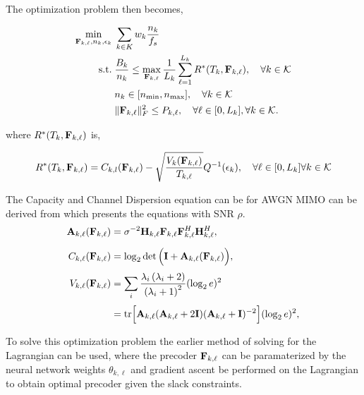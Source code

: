 \documentclass[a4paper, 12pt, onecolumn, journal, twoside, draftclsnofoot]{IEEEtran}
\begin{document}
The optimization problem then becomes, 

\begin{equation*}
	\begin{split}
		\min_{{\bf F}_{k,\ell}, n_k, \epsilon_k} \;& \sum_{k \in K} w_k \frac{n_k}{f_s} \\
		\text{s.t.}\;& \frac{B_k}{n_k} \leq \max_{{\bf F}_{k, \ell}} \frac{1}{L_k} \sum_{\ell=1}^{L_k} 		R^*(T_{k}, {\bf F}_{k, \ell}), \quad \forall k \in { \mathcal{K} } \\ 
		& n_k \in [n_{\text{min}}, n_{\text{max}}], \quad \forall k \in { \mathcal{K} } \\
		& \|{\bf F}_{k,\ell}\|_F^2 \leq P_{k,\ell}, \quad \forall \ell \in [0, L_k],  \forall k \in { \mathcal{K} }.
	\end{split}
\end{equation*}

where $R^*(T_k, {\bf F}_{k,\ell})$ is,

\begin{equation*}
	R^*(T_{k} , {\bf F}_{k,\ell}) =  C_{k,l}({\bf F}_{k,\ell}) - \sqrt{ \frac{V_k({\bf F}_{k,\ell})}{ T_{k, \ell} } } Q^{-1}  (\epsilon_k), \quad \forall \ell \in [0,L_k] \forall k \in { \mathcal{K} }\\
\end{equation*}

The Capacity and Channel Dispersion equation can be for AWGN MIMO can be derived from \cite{yuri2010} which presents the equations with SNR $\rho$.
\begin{equation*}
	\begin{aligned}
		\mathbf{A}_{k,\ell}({\bf F}_{k,\ell}) &= \sigma^{-2} \mathbf{H}_{k,\ell} {\bf F}_{k,\ell} {\bf F}_{k,\ell}^H \mathbf{H}_{k,\ell}^H, \\[2mm]
		C_{k,\ell}({\bf F}_{k,\ell}) &= \log_2 \det \Big( \mathbf{I} + \mathbf{A}_{k,\ell}({\bf F}_{k,\ell}) \Big), \\[1mm]
		V_{k,\ell}({\bf F}_{k,\ell}) &= \sum_i \frac{\lambda_i \left(\lambda_i + 2 \right)}{\left(\lambda_i + 1 \right)^2} (\log_2 e)^2 \\[1mm]
		&= \text{tr} \Big[ \mathbf{A}_{k,\ell} (\mathbf{A}_{k,\ell}+2 \mathbf{I}) (\mathbf{A}_{k,\ell} + \mathbf{I})^{-2} \Big] (\log_2 e)^2,
	\end{aligned}
\end{equation*}


To solve this optimization problem the earlier method of solving for the Lagrangian can be used, where the precoder ${\bf F}_{k,\ell}$ can be paramaterized by the neural network weights $\theta_{k,\ell}$ and gradient ascent be performed on the Lagrangian to obtain optimal precoder given the slack constraints.
\end{document}
